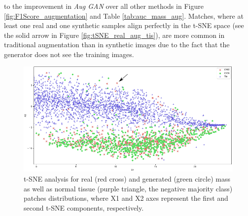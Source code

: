 \documentclass[final,3p,twocolumn,authoryear,sort&compress,times]{maia}
\begin{document}
to the improvement in \textit{Aug GAN} over all other methods in Figure \ref{fig:F1Score_augmentation} and Table \ref{tab:auc_mass_aug}. Matches, where at least one real and one synthetic samples align perfectly in the t-SNE space (see the solid arrow in Figure \ref{fig:tSNE_real_aug_tis}), are more common in traditional augmentation than in synthetic images due to the fact that the generator does not see the training images.


\begin{figure}[htp]
\centering
\includegraphics[scale=1]{figures/tSNE_real_fake_tis_arrow.pdf}
\caption{t-SNE analysis for real (red cross) and generated (green circle) mass as well as normal tissue (purple triangle, the negative majority class) patches distributions, where X1 and X2 axes represent the first and second t-SNE components, respectively.}
\label{fig:tSNE_real_fake_tis}
\end{figure}
\end{document}
